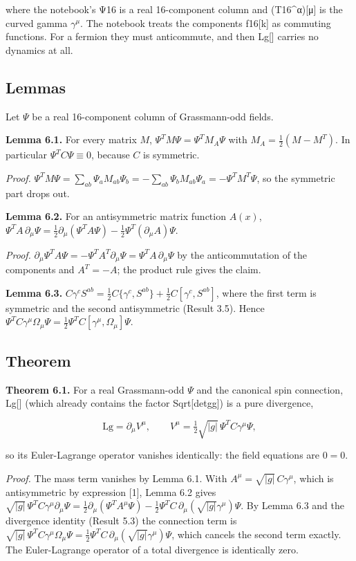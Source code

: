 \documentclass[11pt]{article}
\begin{document}
where the notebook's Ψ16 is a real 16-component column and (T16\textasciicircum{}α)[μ] is the curved gamma $\gamma^\mu$. The notebook treats the components f16[k] as commuting functions. For a fermion they must anticommute, and then Lg[] carries no dynamics at all.

\subsection{Lemmas}

Let $\Psi$ be a real 16-component column of Grassmann-odd fields.

\textbf{Lemma 6.1.} For every matrix $M$, $\Psi^TM\Psi=\Psi^TM_A\Psi$ with $M_A=\tfrac12(M-M^T)$. In particular $\Psi^TC\Psi\equiv0$, because $C$ is symmetric.

\emph{Proof.} $\Psi^TM\Psi=\sum_{ab}\Psi_aM_{ab}\Psi_b=-\sum_{ab}\Psi_bM_{ab}\Psi_a=-\Psi^TM^T\Psi$, so the symmetric part drops out.

\textbf{Lemma 6.2.} For an antisymmetric matrix function $A(x)$, $\Psi^TA\,\partial_\mu\Psi=\tfrac12\partial_\mu(\Psi^TA\Psi)-\tfrac12\Psi^T(\partial_\mu A)\Psi$.

\emph{Proof.} $\partial_\mu\Psi^T A\Psi=-\Psi^TA^T\partial_\mu\Psi=\Psi^TA\,\partial_\mu\Psi$ by the anticommutation of the components and $A^T=-A$; the product rule gives the claim.

\textbf{Lemma 6.3.} $C\gamma^cS^{ab}=\tfrac12C\{\gamma^c,S^{ab}\}+\tfrac12C[\gamma^c,S^{ab}]$, where the first term is symmetric and the second antisymmetric (Result 3.5). Hence $\Psi^TC\gamma^\mu\Omega_\mu\Psi=\tfrac12\Psi^TC[\gamma^\mu,\Omega_\mu]\Psi$.

\subsection{Theorem}

\textbf{Theorem 6.1.} For a real Grassmann-odd $\Psi$ and the canonical spin connection, Lg[] (which already contains the factor Sqrt[detgg]) is a pure divergence,

\[
\mathrm{Lg}=\partial_\mu V^\mu,\qquad V^\mu=\tfrac12\sqrt{|g|}\,\Psi^TC\gamma^\mu\Psi,
\]

so its Euler-Lagrange operator vanishes identically: the field equations are $0=0$.

\emph{Proof.} The mass term vanishes by Lemma 6.1. With $A^\mu=\sqrt{|g|}\,C\gamma^\mu$, which is antisymmetric by expression [1], Lemma 6.2 gives $\sqrt{|g|}\,\Psi^TC\gamma^\mu\partial_\mu\Psi=\tfrac12\partial_\mu(\Psi^TA^\mu\Psi)-\tfrac12\Psi^TC\,\partial_\mu(\sqrt{|g|}\gamma^\mu)\Psi$. By Lemma 6.3 and the divergence identity (Result 5.3) the connection term is $\sqrt{|g|}\,\Psi^TC\gamma^\mu\Omega_\mu\Psi=\tfrac12\Psi^TC\,\partial_\mu(\sqrt{|g|}\gamma^\mu)\Psi$, which cancels the second term exactly. The Euler-Lagrange operator of a total divergence is identically zero.
\end{document}
